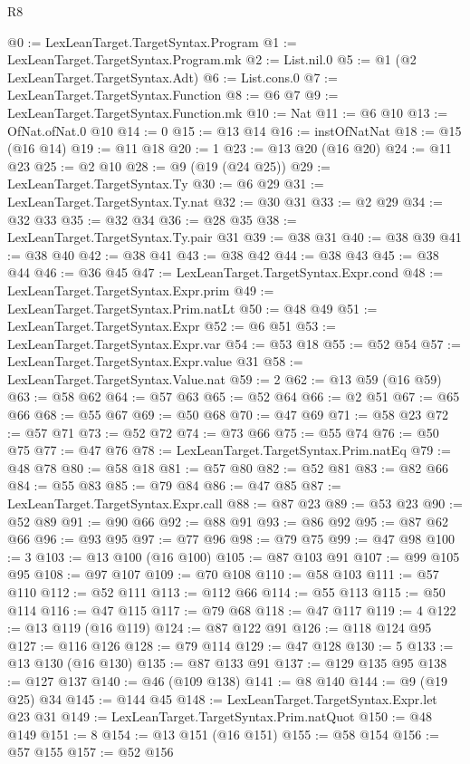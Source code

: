 \begin{lexlean}{R8}
\begin{coremodule}
@0 := LexLeanTarget.TargetSyntax.Program
@1 := LexLeanTarget.TargetSyntax.Program.mk
@2 := List.nil.{0}
@5 := @1 (@2 LexLeanTarget.TargetSyntax.Adt)
@6 := List.cons.{0}
@7 := LexLeanTarget.TargetSyntax.Function
@8 := @6 @7
@9 := LexLeanTarget.TargetSyntax.Function.mk
@10 := Nat
@11 := @6 @10
@13 := OfNat.ofNat.{0} @10
@14 := 0
@15 := @13 @14
@16 := instOfNatNat
@18 := @15 (@16 @14)
@19 := @11 @18
@20 := 1
@23 := @13 @20 (@16 @20)
@24 := @11 @23
@25 := @2 @10
@28 := @9 (@19 (@24 @25))
@29 := LexLeanTarget.TargetSyntax.Ty
@30 := @6 @29
@31 := LexLeanTarget.TargetSyntax.Ty.nat
@32 := @30 @31
@33 := @2 @29
@34 := @32 @33
@35 := @32 @34
@36 := @28 @35
@38 := LexLeanTarget.TargetSyntax.Ty.pair @31
@39 := @38 @31
@40 := @38 @39
@41 := @38 @40
@42 := @38 @41
@43 := @38 @42
@44 := @38 @43
@45 := @38 @44
@46 := @36 @45
@47 := LexLeanTarget.TargetSyntax.Expr.cond
@48 := LexLeanTarget.TargetSyntax.Expr.prim
@49 := LexLeanTarget.TargetSyntax.Prim.natLt
@50 := @48 @49
@51 := LexLeanTarget.TargetSyntax.Expr
@52 := @6 @51
@53 := LexLeanTarget.TargetSyntax.Expr.var
@54 := @53 @18
@55 := @52 @54
@57 := LexLeanTarget.TargetSyntax.Expr.value @31
@58 := LexLeanTarget.TargetSyntax.Value.nat
@59 := 2
@62 := @13 @59 (@16 @59)
@63 := @58 @62
@64 := @57 @63
@65 := @52 @64
@66 := @2 @51
@67 := @65 @66
@68 := @55 @67
@69 := @50 @68
@70 := @47 @69
@71 := @58 @23
@72 := @57 @71
@73 := @52 @72
@74 := @73 @66
@75 := @55 @74
@76 := @50 @75
@77 := @47 @76
@78 := LexLeanTarget.TargetSyntax.Prim.natEq
@79 := @48 @78
@80 := @58 @18
@81 := @57 @80
@82 := @52 @81
@83 := @82 @66
@84 := @55 @83
@85 := @79 @84
@86 := @47 @85
@87 := LexLeanTarget.TargetSyntax.Expr.call
@88 := @87 @23
@89 := @53 @23
@90 := @52 @89
@91 := @90 @66
@92 := @88 @91
@93 := @86 @92
@95 := @87 @62 @66
@96 := @93 @95
@97 := @77 @96
@98 := @79 @75
@99 := @47 @98
@100 := 3
@103 := @13 @100 (@16 @100)
@105 := @87 @103 @91
@107 := @99 @105 @95
@108 := @97 @107
@109 := @70 @108
@110 := @58 @103
@111 := @57 @110
@112 := @52 @111
@113 := @112 @66
@114 := @55 @113
@115 := @50 @114
@116 := @47 @115
@117 := @79 @68
@118 := @47 @117
@119 := 4
@122 := @13 @119 (@16 @119)
@124 := @87 @122 @91
@126 := @118 @124 @95
@127 := @116 @126
@128 := @79 @114
@129 := @47 @128
@130 := 5
@133 := @13 @130 (@16 @130)
@135 := @87 @133 @91
@137 := @129 @135 @95
@138 := @127 @137
@140 := @46 (@109 @138)
@141 := @8 @140
@144 := @9 (@19 @25) @34
@145 := @144 @45
@148 := LexLeanTarget.TargetSyntax.Expr.let @23 @31
@149 := LexLeanTarget.TargetSyntax.Prim.natQuot
@150 := @48 @149
@151 := 8
@154 := @13 @151 (@16 @151)
@155 := @58 @154
@156 := @57 @155
@157 := @52 @156

\end{coremodule}
\end{lexlean}
